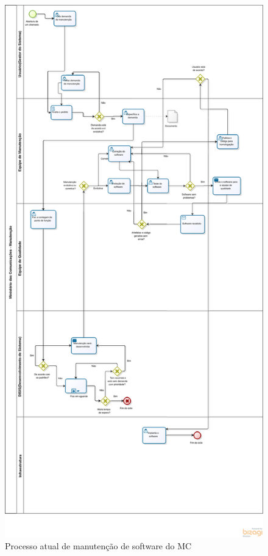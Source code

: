 \begin{apendicesenv}
\begin{figure}[H]
    \centering
	\includegraphics[keepaspectratio=true,scale=0.35]{figuras/MC_Processo_Atual.eps}
    \caption{Processo atual de manutenção de software do MC}
    \label{fig:process_atual_mc}
\end{figure}

\end{apendicesenv}
